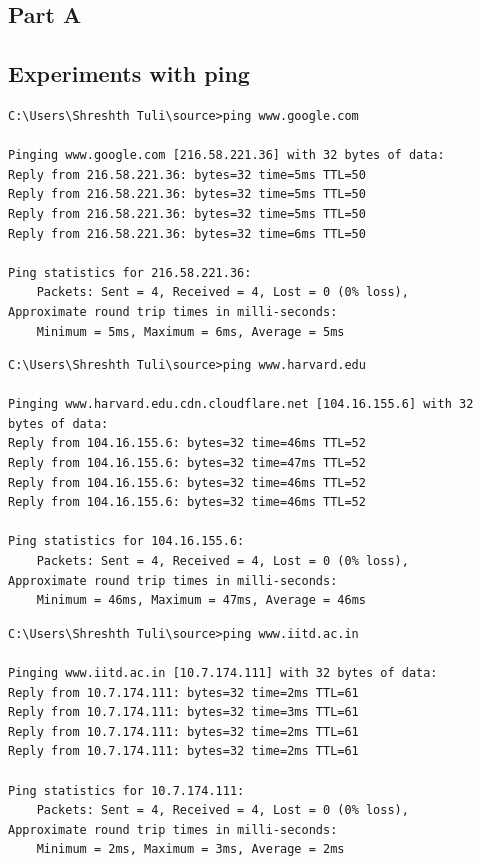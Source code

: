 \documentclass[a4paper, 11pt]{article}
\begin{document}
\begin{appendices}

\section{Part A}

\subsection{Experiments with ping}
\label{appendix:ping}
\begin{lstlisting}[style=BashInputStyle]
C:\Users\Shreshth Tuli\source>ping www.google.com

Pinging www.google.com [216.58.221.36] with 32 bytes of data:
Reply from 216.58.221.36: bytes=32 time=5ms TTL=50
Reply from 216.58.221.36: bytes=32 time=5ms TTL=50
Reply from 216.58.221.36: bytes=32 time=5ms TTL=50
Reply from 216.58.221.36: bytes=32 time=6ms TTL=50

Ping statistics for 216.58.221.36:
    Packets: Sent = 4, Received = 4, Lost = 0 (0% loss),
Approximate round trip times in milli-seconds:
    Minimum = 5ms, Maximum = 6ms, Average = 5ms
\end{lstlisting}  

\begin{lstlisting}[style=BashInputStyle]
C:\Users\Shreshth Tuli\source>ping www.harvard.edu

Pinging www.harvard.edu.cdn.cloudflare.net [104.16.155.6] with 32 bytes of data:
Reply from 104.16.155.6: bytes=32 time=46ms TTL=52
Reply from 104.16.155.6: bytes=32 time=47ms TTL=52
Reply from 104.16.155.6: bytes=32 time=46ms TTL=52
Reply from 104.16.155.6: bytes=32 time=46ms TTL=52

Ping statistics for 104.16.155.6:
    Packets: Sent = 4, Received = 4, Lost = 0 (0% loss),
Approximate round trip times in milli-seconds:
    Minimum = 46ms, Maximum = 47ms, Average = 46ms
\end{lstlisting}  

\begin{lstlisting}[style=BashInputStyle]
C:\Users\Shreshth Tuli\source>ping www.iitd.ac.in

Pinging www.iitd.ac.in [10.7.174.111] with 32 bytes of data:
Reply from 10.7.174.111: bytes=32 time=2ms TTL=61
Reply from 10.7.174.111: bytes=32 time=3ms TTL=61
Reply from 10.7.174.111: bytes=32 time=2ms TTL=61
Reply from 10.7.174.111: bytes=32 time=2ms TTL=61

Ping statistics for 10.7.174.111:
    Packets: Sent = 4, Received = 4, Lost = 0 (0% loss),
Approximate round trip times in milli-seconds:
    Minimum = 2ms, Maximum = 3ms, Average = 2ms
\end{lstlisting}


\end{appendices}
\end{document}
